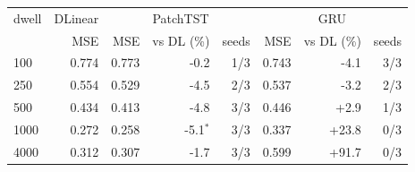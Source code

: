 \begin{tabular}{lrrrrrrr}
\toprule
dwell & DLinear & \multicolumn{3}{c}{PatchTST} & \multicolumn{3}{c}{GRU}\\
 & MSE & MSE & vs DL (\%) & seeds & MSE & vs DL (\%) & seeds\\
\midrule
100 & 0.774 & 0.773 & -0.2 & 1/3 & 0.743 & -4.1 & 3/3\\
250 & 0.554 & 0.529 & -4.5 & 2/3 & 0.537 & -3.2 & 2/3\\
500 & 0.434 & 0.413 & -4.8 & 3/3 & 0.446 & +2.9 & 1/3\\
1000 & 0.272 & 0.258 & -5.1$^\ast$ & 3/3 & 0.337 & +23.8 & 0/3\\
4000 & 0.312 & 0.307 & -1.7 & 3/3 & 0.599 & +91.7 & 0/3\\
\bottomrule
\end{tabular}